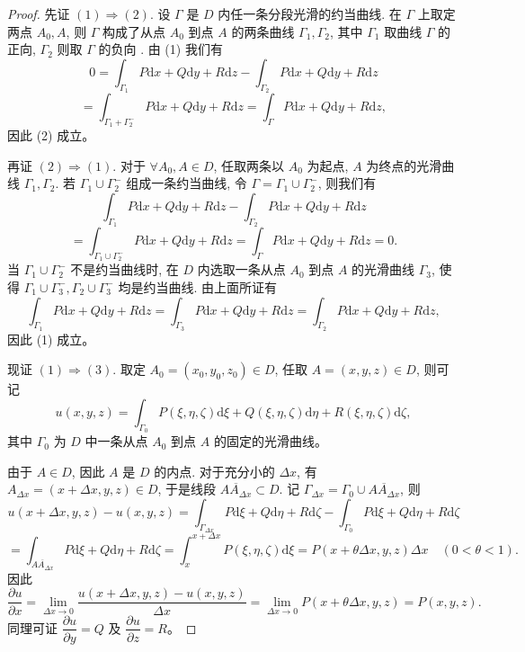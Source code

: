 \documentclass[12pt,fontset=fandol]{ctexart}
\begin{document}
\begin{proof}\quad 先证 $(1)\Rightarrow(2)$. 设 $\Gamma$ 是 $D$ 内任一条分段光滑的约当曲线. 在 $\Gamma$ 上取定两点 $A_0,A$, 则 $\Gamma$ 构成了从点 $A_0$ 到点 $A$ 的两条曲线 $\Gamma_1,\Gamma_2$, 其中 $\Gamma_1$ 取曲线 $\Gamma$ 的正向, $\Gamma_2$ 则取 $\Gamma$ 的负向 . 由 (1) 我们有
\[
  0=\int_{\Gamma_1}P\mathrm dx+Q\mathrm dy+R\mathrm dz
  -\int_{\Gamma_2}P\mathrm dx+Q\mathrm dy+R\mathrm dz
\]
\[
  =\int_{\Gamma_1+\Gamma_2^-}P\mathrm dx+Q\mathrm dy+R\mathrm dz
  =\int_\Gamma P\mathrm dx+Q\mathrm dy+R\mathrm dz,
\]
因此 (2) 成立。

再证 $(2)\Rightarrow(1)$. 对于 $\forall A_0,A\in D$, 任取两条以 $A_0$ 为起点, $A$ 为终点的光滑曲线 $\Gamma_1,\Gamma_2$. 若 $\Gamma_1\cup\Gamma_2^-$ 组成一条约当曲线, 令 $\Gamma=\Gamma_1\cup\Gamma_2^-$, 则我们有
\[
  \int_{\Gamma_1}P\mathrm dx+Q\mathrm dy+R\mathrm dz
  -\int_{\Gamma_2}P\mathrm dx+Q\mathrm dy+R\mathrm dz
\]
\[
  =\int_{\Gamma_1\cup\Gamma_2^-}P\mathrm dx+Q\mathrm dy+R\mathrm dz
  =\int_\Gamma P\mathrm dx+Q\mathrm dy+R\mathrm dz=0.
\]
当 $\Gamma_1\cup\Gamma_2^-$ 不是约当曲线时, 在 $D$ 内选取一条从点 $A_0$ 到点 $A$ 的光滑曲线 $\Gamma_3$, 使得 $\Gamma_1\cup\Gamma_3^-,\Gamma_2\cup\Gamma_3^-$ 均是约当曲线. 由上面所证有
\[
  \int_{\Gamma_1}P\mathrm dx+Q\mathrm dy+R\mathrm dz
  =\int_{\Gamma_3}P\mathrm dx+Q\mathrm dy+R\mathrm dz
  =\int_{\Gamma_2}P\mathrm dx+Q\mathrm dy+R\mathrm dz,
\]
因此 (1) 成立。

现证 $(1)\Rightarrow(3)$. 取定 $A_0=(x_0,y_0,z_0)\in D$, 任取 $A=(x,y,z)\in D$, 则可记
\[
  u(x,y,z)=\int_{\Gamma_0}P(\xi,\eta,\zeta)\mathrm d\xi
  +Q(\xi,\eta,\zeta)\mathrm d\eta
  +R(\xi,\eta,\zeta)\mathrm d\zeta,
\]
其中 $\Gamma_0$ 为 $D$ 中一条从点 $A_0$ 到点 $A$ 的固定的光滑曲线。

由于 $A\in D$, 因此 $A$ 是 $D$ 的内点. 对于充分小的 $\Delta x$, 有 $A_{\Delta x}=(x+\Delta x,y,z)\in D$, 于是线段 $\overline{AA_{\Delta x}}\subset D$. 记 $\Gamma_{\Delta x}=\Gamma_0\cup\overline{AA_{\Delta x}}$, 则
\[
  u(x+\Delta x,y,z)-u(x,y,z)
  =
  \int_{\Gamma_{\Delta x}}P\mathrm d\xi+Q\mathrm d\eta+R\mathrm d\zeta
  -\int_{\Gamma_0}P\mathrm d\xi+Q\mathrm d\eta+R\mathrm d\zeta
\]
\[
  =\int_{\overline{AA_{\Delta x}}}P\mathrm d\xi+Q\mathrm d\eta+R\mathrm d\zeta
  =\int_x^{x+\Delta x}P(\xi,\eta,\zeta)\mathrm d\xi
  =P(x+\theta\Delta x,y,z)\Delta x\quad(0<\theta<1).
\]
因此
\[
  \frac{\partial u}{\partial x}
  =\lim_{\Delta x\to0}\frac{u(x+\Delta x,y,z)-u(x,y,z)}{\Delta x}
  =\lim_{\Delta x\to0}P(x+\theta\Delta x,y,z)=P(x,y,z).
\]
同理可证 $\dfrac{\partial u}{\partial y}=Q$ 及 $\dfrac{\partial u}{\partial z}=R$。


\end{proof}
\end{document}
